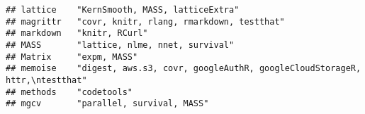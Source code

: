 \documentclass[
]{article}
\begin{document}
\begin{verbatim}
## lattice    "KernSmooth, MASS, latticeExtra"                                                                                                                                                                                                                                                                                                                   
## magrittr   "covr, knitr, rlang, rmarkdown, testthat"                                                                                                                                                                                                                                                                                                          
## markdown   "knitr, RCurl"                                                                                                                                                                                                                                                                                                                                     
## MASS       "lattice, nlme, nnet, survival"                                                                                                                                                                                                                                                                                                                    
## Matrix     "expm, MASS"                                                                                                                                                                                                                                                                                                                                       
## memoise    "digest, aws.s3, covr, googleAuthR, googleCloudStorageR, httr,\ntestthat"                                                                                                                                                                                                                                                                          
## methods    "codetools"                                                                                                                                                                                                                                                                                                                                        
## mgcv       "parallel, survival, MASS"                                                                                                                                                                                                                                                                                                                         

\end{verbatim}
\end{document}
